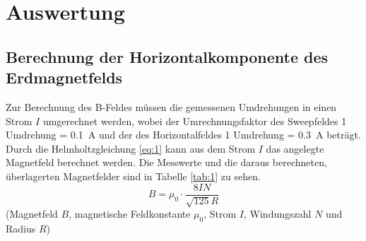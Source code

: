 \section{Auswertung}

\subsection{Berechnung der Horizontalkomponente des Erdmagnetfelds}
Zur Berechnung des B-Feldes müssen die gemessenen Umdrehungen in einen Strom
$I$ umgerechnet werden, wobei der Umrechnungsfaktor des Sweepfeldes 1 Umdrehung
= \SI{0,1}{\ampere} und der des Horizontalfeldes 1 Umdrehung = \SI{0,3}{\ampere}
beträgt.
Durch die Helmholtzgleichung \eqref{eq:1} kann aus dem Strom $I$ das angelegte
Magnetfeld berechnet werden. Die Messwerte und die daraus berechneten,
überlagerten Magnetfelder sind
in Tabelle \ref{tab:1} zu sehen.
\begin{equation}
  \label{eq:1}
  B = \mu_0 \cdot \frac{8IN}{\sqrt{125}R}
\end{equation}
(Magnetfeld $B$, magnetische Feldkonstante $\mu_0$, Strom $I$, Windungszahl $N$
und Radius $R$)

